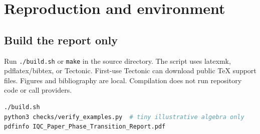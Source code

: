 \documentclass[11pt,letterpaper]{article}
\newcommand{\file}[1]{\nolinkurl{#1}}
\begin{document}
\section{Reproduction and environment}\label{sec:reproduce}
\subsection{Build the report only}
Run \file{./build.sh} or \file{make} in the source directory. The script uses latexmk, pdflatex/bibtex, or Tectonic. First-use Tectonic can download public TeX support files. Figures and bibliography are local. Compilation does not run repository code or call providers.
\begin{lstlisting}[language=bash]
./build.sh
python3 checks/verify_examples.py  # tiny illustrative algebra only
pdfinfo IQC_Paper_Phase_Transition_Report.pdf
\end{lstlisting}
\end{document}
